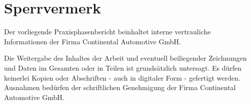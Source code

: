 
\pagestyle{scrheadings}
\clearscrheadfoot
{}
\setheadsepline[1.055\textwidth]{1pt}
\setfootsepline[1.055\textwidth]{1pt}


\section*{Sperrvermerk}

Der vorliegende Praxisphasenbericht beinhaltet interne vertrauliche Informationen der Firma Continental Automotive GmbH.

Die Weitergabe des Inhaltes der Arbeit und eventuell beiliegender Zeichnungen und Daten im Gesamten oder in Teilen ist grundsätzlich untersagt. Es dürfen keinerlei Kopien oder Abschriften - auch in digitaler Form - gefertigt werden. Ausnahmen bedürfen der schriftlichen Genehmigung der Firma Continental Automotive GmbH.